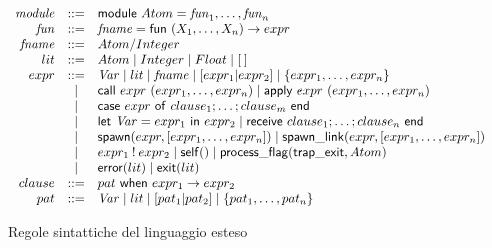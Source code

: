 \documentclass[Contributo.tex]{subfiles}
\begin{document}
\begin{figure}[H]
  $\displaystyle
  \begin{array}{rcl@{~~~~~~}l}
    \mathit{module} & ::= & \mathsf{module} ~ Atom = %
    \mathit{fun}_1,\ldots,\mathit{fun}_n\\
    {\mathit{fun}} & ::= & \mathit{fname} = \mathsf{fun}~(X_1,\ldots,X_n) \to expr \\
    {\mathit{fname}} & ::= & Atom/Integer \\
    lit & ::= & Atom \mid Integer \mid Float \mid \nil \\
    expr & ::= & \mathit{Var} \mid lit \mid \mathit{fname} \mid [expr_1|expr_2]
                 \mid   \{expr_1,\ldots,expr_n\} \\
    & \mid & \mathsf{call}~expr~(expr_1,\ldots,expr_n) 
    \mid \mathsf{apply}~expr~(expr_1,\ldots,expr_n) \\
    & \mid &
    \mathsf{case}~expr~\mathsf{of}~clause_1;\ldots;clause_m~\mathsf{end}\\
    & \mid & \mathsf{let}~\mathit{Var}=expr_1~\mathsf{in}~expr_2 
    \mid \mathsf{receive}~clause_1;\ldots;clause_n~\mathsf{end}\\
    & \mid & \mathsf{spawn}(expr,[expr_1,\ldots,expr_n])  \mid \mathsf{spawn\_link}(expr,[expr_1,\ldots,expr_n])\\
    & \mid & expr_1 \:!\: expr_2 \mid \mathsf{self}() \mid \mathsf{process\_flag}(\mathsf{trap\_exit},Atom)\\
    & \mid & \mathsf{error}(lit) \mid \mathsf{exit}(lit)\\
     clause & ::= & pat ~\mathsf{when}~expr_1 \to expr_2
    \\
    pat & ::= & \mathit{Var} \mid lit \mid [pat_1|pat_2] \mid
    \{pat_1,\ldots,pat_n\} \\
  \end{array}
  $
\caption{Regole sintattiche del linguaggio esteso} 
\label{newrules}
\end{figure}
\end{document}
